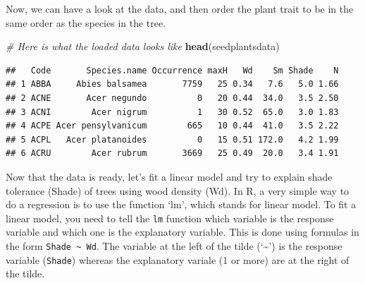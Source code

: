 \documentclass[
]{book}
\newenvironment{Shaded}{\begin{snugshade}}{\end{snugshade}}
\newcommand{\CommentTok}[1]{\textcolor[rgb]{0.56,0.35,0.01}{\textit{#1}}}
\newcommand{\FunctionTok}[1]{\textcolor[rgb]{0.13,0.29,0.53}{\textbf{#1}}}
\newcommand{\NormalTok}[1]{#1}
\newcommand{\OtherTok}[1]{\textcolor[rgb]{0.56,0.35,0.01}{#1}}
\newcommand{\SpecialCharTok}[1]{\textcolor[rgb]{0.81,0.36,0.00}{\textbf{#1}}}
\begin{document}
Now, we can have a look at the data, and then order the plant trait to be in the same order as the species in the tree.

\begin{Shaded}
\begin{Highlighting}[]
\CommentTok{\# Here is what the loaded data looks like}
\FunctionTok{head}\NormalTok{(seedplantsdata)}
\end{Highlighting}
\end{Shaded}

\begin{verbatim}
##   Code       Species.name Occurrence maxH   Wd    Sm Shade    N
## 1 ABBA     Abies balsamea       7759   25 0.34   7.6   5.0 1.66
## 2 ACNE       Acer negundo          0   20 0.44  34.0   3.5 2.50
## 3 ACNI        Acer nigrum          1   30 0.52  65.0   3.0 1.83
## 4 ACPE Acer pensylvanicum        665   10 0.44  41.0   3.5 2.22
## 5 ACPL   Acer platanoides          0   15 0.51 172.0   4.2 1.99
## 6 ACRU        Acer rubrum       3669   25 0.49  20.0   3.4 1.91
\end{verbatim}

\begin{Shaded}
\end{Shaded}

Now that the data is ready, let's fit a linear model and try to explain shade tolerance (Shade) of trees using wood density (Wd). In R, a very simple way to do a regression is to use the function `lm', which stands for linear model. To fit a linear model, you need to tell the \texttt{lm} function which variable is the response variable and which one is the explanatory variable. This is done using formulas in the form \texttt{Shade\ \textasciitilde{}\ Wd}. The variable at the left of the tilde (`\textasciitilde{}') is the response variable (\texttt{Shade}) whereas the explanatory variale (1 or more) are at the right of the tilde.
\end{document}
